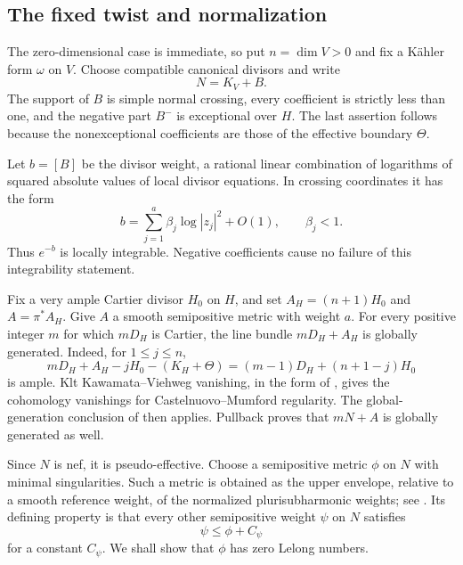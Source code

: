 \subsection{The fixed twist and normalization}

The zero-dimensional case is
immediate, so put $n=\dim V>0$ and fix a K\"ahler form $\omega$ on
$V$.  Choose compatible canonical divisors
and write
\begin{equation}\label{eq:adjoint-boundary}
 N=K_V+B.
\end{equation}
The support of $B$ is simple normal crossing, every coefficient is
strictly less than one, and the negative part $B^-$ is exceptional over
$H$.  The last assertion follows because the nonexceptional
coefficients are those of the effective boundary $\Theta$.

Let $b=[B]$ be the divisor weight, a rational linear combination of
logarithms of squared absolute values of local divisor equations.  In
crossing coordinates it has the form
\[
 b=\sum_{j=1}^{a}\beta_j\log|z_j|^2+O(1),\qquad \beta_j<1.
\]
Thus $e^{-b}$ is locally integrable.  Negative coefficients cause no
failure of this integrability statement.

Fix a very ample Cartier divisor $H_0$ on $H$, and set
$A_H=(n+1)H_0$ and $A=\pi^*A_H$.  Give $A$ a smooth semipositive
metric with weight $a$.  For every positive integer $m$ for which
$mD_H$ is Cartier, the line bundle $mD_H+A_H$ is globally generated.
Indeed, for $1\le j\le n$,
\[
 mD_H+A_H-jH_0-(K_H+\Theta)
 =(m-1)D_H+(n+1-j)H_0
\]
is ample.  Klt Kawamata--Viehweg vanishing, in the form of
\cite[Theorem~3.2]{Fujino2011}, gives the cohomology vanishings for
Castelnuovo--Mumford regularity.  The global-generation conclusion of
\cite[Theorem~1.8.5(i)]{Lazarsfeld2004I} then applies.  Pullback proves
that $mN+A$ is globally generated as well.

Since $N$ is nef, it is pseudo-effective.  Choose a semipositive metric
$\phi$ on $N$ with minimal singularities.  Such a metric is obtained
as the upper envelope, relative to a smooth reference weight, of the
normalized plurisubharmonic weights; see
\cite[Definition~1.4 and Theorem~1.5]{DPS2001}.  Its defining property is
that every other semipositive weight $\psi$ on $N$ satisfies
\begin{equation}\label{eq:minimal-weight-comparison}
 \psi\le\phi+C_\psi
\end{equation}
for a constant $C_\psi$.  We shall show that $\phi$ has zero Lelong
numbers.

